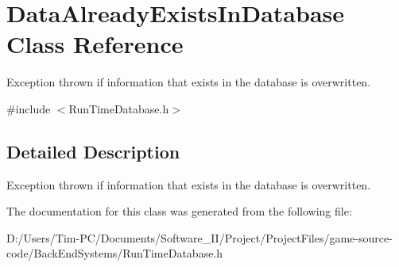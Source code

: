 \hypertarget{class_data_already_exists_in_database}{}\section{Data\+Already\+Exists\+In\+Database Class Reference}
\label{class_data_already_exists_in_database}


Exception thrown if information that exists in the database is overwritten.  




{\ttfamily \#include $<$Run\+Time\+Database.\+h$>$}



\subsection{Detailed Description}
Exception thrown if information that exists in the database is overwritten. 

The documentation for this class was generated from the following file\+:\begin{DoxyCompactItemize}
\item 
D\+:/\+Users/\+Tim-\/\+P\+C/\+Documents/\+Software\+\_\+\+I\+I/\+Project/\+Project\+Files/game-\/source-\/code/\+Back\+End\+Systems/Run\+Time\+Database.\+h\end{DoxyCompactItemize}

